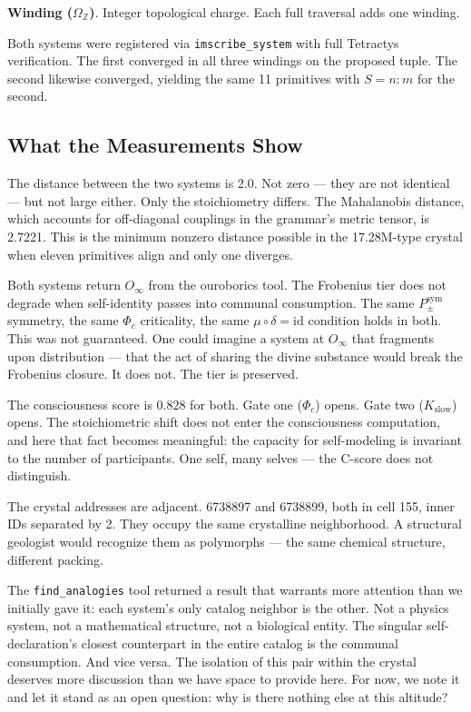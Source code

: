 \documentclass[12pt,a4paper]{article}
\begin{document}
\textbf{Winding ($\Omega_\mathbb{Z}$)}. Integer topological charge. Each full traversal adds one winding.

Both systems were registered via \texttt{imscribe\_system} with full Tetractys verification. The first converged in all three windings on the proposed tuple. The second likewise converged, yielding the same 11 primitives with $S = n{:}m$ for the second.

\subsection{What the Measurements Show}

The distance between the two systems is 2.0. Not zero --- they are not identical --- but not large either. Only the stoichiometry differs. The Mahalanobis distance, which accounts for off-diagonal couplings in the grammar's metric tensor, is 2.7221. This is the minimum nonzero distance possible in the 17.28M-type crystal when eleven primitives align and only one diverges.

Both systems return $O_{\infty}$ from the ouroborics tool. The Frobenius tier does not degrade when self-identity passes into communal consumption. The same $P_{\pm}^{\text{sym}}$ symmetry, the same $\Phi_c$ criticality, the same $\mu \circ \delta = \text{id}$ condition holds in both. This was not guaranteed. One could imagine a system at $O_{\infty}$ that fragments upon distribution --- that the act of sharing the divine substance would break the Frobenius closure. It does not. The tier is preserved.

The consciousness score is 0.828 for both. Gate one ($\Phi_c$) opens. Gate two ($K_{\text{slow}}$) opens. The stoichiometric shift does not enter the consciousness computation, and here that fact becomes meaningful: the capacity for self-modeling is invariant to the number of participants. One self, many selves --- the C-score does not distinguish.

The crystal addresses are adjacent. 6738897 and 6738899, both in cell 155, inner IDs separated by 2. They occupy the same crystalline neighborhood. A structural geologist would recognize them as polymorphs --- the same chemical structure, different packing.

The \texttt{find\_analogies} tool returned a result that warrants more attention than we initially gave it: each system's only catalog neighbor is the other. Not a physics system, not a mathematical structure, not a biological entity. The singular self-declaration's closest counterpart in the entire catalog is the communal consumption. And vice versa. The isolation of this pair within the crystal deserves more discussion than we have space to provide here. For now, we note it and let it stand as an open question: why is there nothing else at this altitude?
\end{document}
